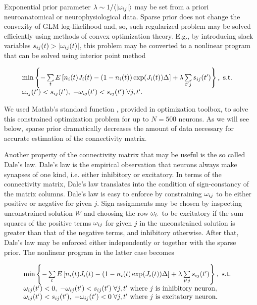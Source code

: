 Exponential prior parameter $\lambda\sim 1/\langle|\omega_{ij}|\rangle$ may be set from a priori neuroanatomical or neurophysiological data. Sparse prior does not change the convexity of GLM log-likelihood and, so, such regularized problem may be solved efficiently using methods of convex optimization theory. E.g., by introducing slack variables $s_{ij}(t)>|\omega_{ij}(t)|$, this problem may be converted to a nonlinear program that can be solved using interior point method

\begin{equation} \label{eqn:conconvexopt}
\begin{array}{l}
\min \left\{-\sum\limits_t E\left[ n_i(t) J_i(t) - (1-n_i(t)) \exp(J_i(t)) \Delta \right]+\lambda \sum\limits_{t'j}s_{ij}(t')\right\}, \text{ s.t. } 
\\ \omega_{ij}(t')<s_{ij}(t'), \; -\omega_{ij}(t')<s_{ij}(t') \; \forall j, t'.
\end{array} 
\end{equation}

We used Matlab's standard function , provided in optimization toolbox, to solve this constrained optimization problem for up to $N=500$ neurons. As we will see below, sparse prior dramatically decreases the amount of data necessary for accurate estimation of the connectivity matrix.

Another property of the connectivity matrix that may be useful is the so called Dale's law. Dale's law is the empirical observation that neurons always make synapses of one kind, i.e. either inhibitory or excitatory. In terms of the connectivity matrix, Dale's law translates into the condition of sign-constancy of the matrix columns. Dale's law is easy to enforce by constraining $\omega_{ij}$ to be either positive or negative for given $j$.  Sign assignments may be chosen by inspecting unconstrained solution $W$ and choosing the row $\omega_{i \cdot}$ to be excitatory if the sum-squares of the positive terms $\omega_{ij}$ for given $j$ in the unconstrained solution is greater than that of the negative terms, and inhibitory otherwise.  After that, Dale's law may be enforced either independently or together with the sparse prior.  The nonlinear program in the latter case becomes

\begin{equation}
\begin{array}{l}
\min \left\{-\sum\limits_t E\left[ n_i(t) J_i(t) - (1-n_i(t) \exp(J_i(t)) \Delta \right]+\lambda \sum\limits_{t'j}s_{ij}(t')\right\}, \text{ s.t. }\\
\omega_{ij}(t')<0, \; -\omega_{ij}(t')<s_{ij}(t') \; \forall j, t'\text{ where }j\text{ is inhibitory neuron}, \\
\omega_{ij}(t')<s_{ij}(t'), \; -\omega_{ij}(t')<0 \; \forall j, t'\text{ where }j\text{ is excitatory neuron}. \\
\end{array}
\end{equation}

